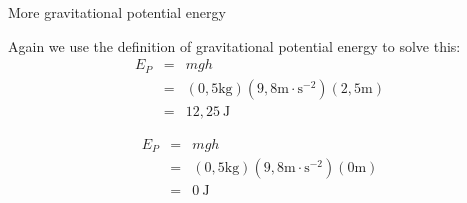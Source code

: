 \begin{wex}{More gravitational potential energy}
{
Again we use the definition of gravitational potential energy to solve this:
\begin{eqnarray*}
E_{P} &=& mgh \\
& = & (0,5\text{kg})(9,8\text{m}\ensuremath{\cdot}\text{s}{}^{-2})(2,5\text{m}) \\
& = & 12,25  \ \text{J}
\end{eqnarray*}

\begin{eqnarray*}
E_{P} &=& mgh \\
& = & (0,5\text{kg})(9,8\text{m}\ensuremath{\cdot}\text{s}{}^{-2})(0\text{m}) \\
& = & 0  \ \text{J}
\end{eqnarray*}

}
\end{wex}

